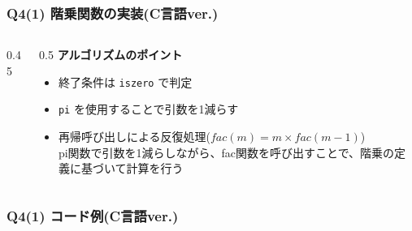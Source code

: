 \begin{frame}[fragile]
\frametitle{Q4(1) 階乗関数の実装(C言語ver.)}
    \begin{columns}[c]
        
        \begin{column}{0.45\textwidth}
            
        \end{column}
        
        \begin{column}{0.5\textwidth}
            \small
            \textbf{アルゴリズムのポイント}
            \begin{itemize}
                \item 終了条件は \texttt{iszero} で判定
                \item \texttt{pi} を使用することで引数を1減らす
                \item 再帰呼び出しによる反復処理($fac(m) = m \times fac(m-1)$) \\
                pi関数で引数を1減らしながら、fac関数を呼び出すことで、階乗の定義に基づいて計算を行う
            \end{itemize}
        \end{column}
        
    \end{columns}
\end{frame}

\begin{frame}[fragile]
\frametitle{Q4(1) コード例(C言語ver.)}
    
\end{frame}

